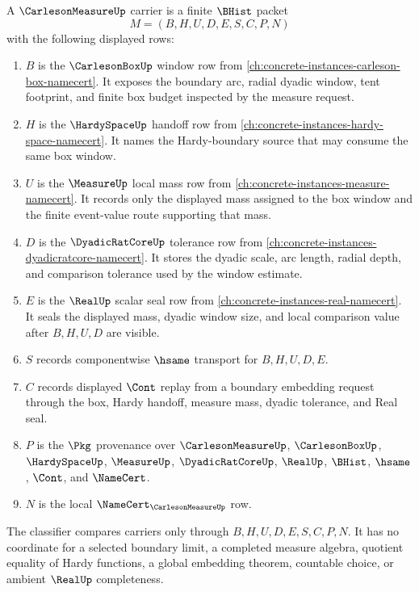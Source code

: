 \begin{definition}
\label{def:carleson-measure-carrier}
A $\CarlesonMeasureUp$ carrier is a finite $\BHist$ packet
$$
M=(B,H,U,D,E,S,C,P,N)
$$
with the following displayed rows:
\begin{enumerate}
\item $B$ is the $\CarlesonBoxUp$ window row from \autoref{ch:concrete-instances-carleson-box-namecert}. It exposes the boundary arc, radial dyadic window, tent footprint, and finite box budget inspected by the measure request.
\item $H$ is the $\HardySpaceUp$ handoff row from \autoref{ch:concrete-instances-hardy-space-namecert}. It names the Hardy-boundary source that may consume the same box window.
\item $U$ is the $\MeasureUp$ local mass row from \autoref{ch:concrete-instances-measure-namecert}. It records only the displayed mass assigned to the box window and the finite event-value route supporting that mass.
\item $D$ is the $\DyadicRatCoreUp$ tolerance row from \autoref{ch:concrete-instances-dyadicratcore-namecert}. It stores the dyadic scale, arc length, radial depth, and comparison tolerance used by the window estimate.
\item $E$ is the $\RealUp$ scalar seal row from \autoref{ch:concrete-instances-real-namecert}. It seals the displayed mass, dyadic window size, and local comparison value after $B,H,U,D$ are visible.
\item $S$ records componentwise $\hsame$ transport for $B,H,U,D,E$.
\item $C$ records displayed $\Cont$ replay from a boundary embedding request through the box, Hardy handoff, measure mass, dyadic tolerance, and Real seal.
\item $P$ is the $\Pkg$ provenance over $\CarlesonMeasureUp$, $\CarlesonBoxUp$, $\HardySpaceUp$, $\MeasureUp$, $\DyadicRatCoreUp$, $\RealUp$, $\BHist$, $\hsame$, $\Cont$, and $\NameCert$.
\item $N$ is the local $\NameCert_{\CarlesonMeasureUp}$ row.
\end{enumerate}
The classifier compares carriers only through $B,H,U,D,E,S,C,P,N$. It has no coordinate for a selected boundary limit, a completed measure algebra, quotient equality of Hardy functions, a global embedding theorem, countable choice, or ambient $\RealUp$ completeness.
\end{definition}

